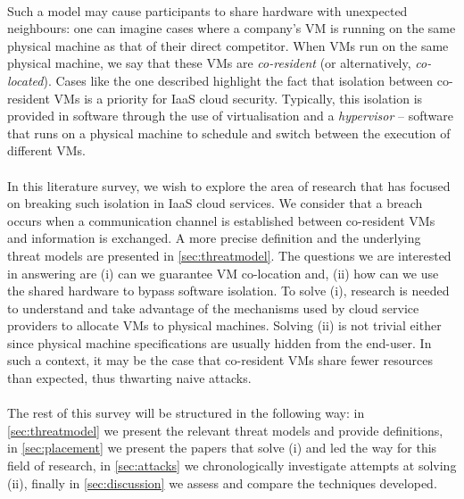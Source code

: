 \documentclass[orivec,envcountsame, a4paper, 11pt]{llncs}
\begin{document}
\paragraph{} Such a model may cause participants to share hardware with unexpected neighbours: one can imagine cases where a company's VM is running on the same physical machine as that of their direct competitor. When VMs run on the same physical machine, we say that these VMs are \textit{co-resident} (or alternatively, \textit{co-located}). Cases like the one described highlight the fact that isolation between co-resident VMs is a priority for IaaS cloud security. Typically, this isolation is provided in software through the use of virtualisation and a \textit{hypervisor} -- software that runs on a physical machine to schedule and switch between the execution of different VMs.

\paragraph{}In this literature survey, we wish to explore the area of research that has focused on breaking such isolation in IaaS cloud services. We consider that a breach occurs when a communication channel is established between co-resident VMs and information is exchanged. A more precise definition and the underlying threat models are presented in \autoref{sec:threatmodel}. The questions we are interested in answering are (i) can we guarantee VM co-location and, (ii) how can we use the shared hardware to bypass software isolation. To solve (i), research is needed to understand and take advantage of the mechanisms used by cloud service providers to allocate VMs to physical machines. Solving (ii) is not trivial either since physical machine specifications are usually hidden from the end-user. In such a context, it may be the case that co-resident VMs share fewer resources than expected, thus thwarting naive attacks.


\paragraph{} The rest of this survey will be structured in the following way: in \autoref{sec:threatmodel} we present the relevant threat models and provide definitions, in \autoref{sec:placement} we present the papers that solve (i) and led the way for this field of research, in \autoref{sec:attacks} we chronologically investigate attempts at solving (ii), finally in \autoref{sec:discussion} we assess and compare the techniques developed.
\end{document}
